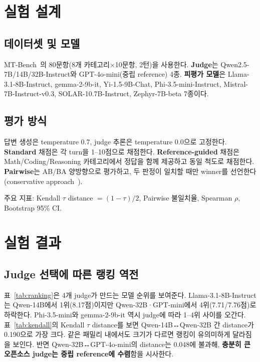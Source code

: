 \documentclass{kcc}
\begin{document}
\section{실험 설계}

\subsection{데이터셋 및 모델}

MT-Bench~\cite{zheng2023}의 80문항(8개 카테고리$\times$10문항, 2턴)을 사용한다.
\textbf{Judge}는 Qwen2.5-7B/14B/32B-Instruct와 GPT-4o-mini(중립 reference) 4종.
\textbf{피평가 모델}은 Llama-3.1-8B-Instruct, gemma-2-9b-it, Yi-1.5-9B-Chat,
Phi-3.5-mini-Instruct, Mistral-7B-Instruct-v0.3, SOLAR-10.7B-Instruct,
Zephyr-7B-beta 7종이다.

\subsection{평가 방식}

답변 생성은 temperature 0.7, judge 추론은 temperature 0.0으로 고정한다.
\textbf{Standard} 채점은 각 turn을 1--10점으로 채점한다.
\textbf{Reference-guided} 채점은 Math/Coding/Reasoning 카테고리에서
정답을 함께 제공하고 동일 척도로 채점한다.
\textbf{Pairwise}는 AB/BA 양방향으로 평가하고, 두 판정이 일치할 때만
winner를 선언한다(conservative approach~\cite{zheng2023}).

주요 지표: Kendall $\tau$ distance $=(1-\tau)/2$, Pairwise 불일치율,
Spearman $\rho$, Bootstrap 95\% CI.

\section{실험 결과}

\subsection{Judge 선택에 따른 랭킹 역전}

표~\ref{tab:ranking}은 4개 judge가 만드는 모델 순위를 보여준다.
Llama-3.1-8B-Instruct는 Qwen-14B에서 1위(8.17점)이지만 Qwen-32B·GPT-mini에서
4위(7.71/7.76점)로 하락한다. Phi-3.5-mini와 gemma-2-9b-it 역시
judge에 따라 1--4위 사이를 오간다. 표~\ref{tab:kendall}의 Kendall $\tau$
distance를 보면 Qwen-14B↔Qwen-32B 간 distance가 0.190으로 가장 크다.
같은 패밀리 내에서도 크기가 다르면 랭킹이 유의미하게 달라짐을 보인다.
반면 Qwen-32B↔GPT-4o-mini의 distance는 0.048에 불과해, \textbf{충분히
큰 오픈소스 judge는 중립 reference에 수렴}함을 시사한다.
\end{document}
